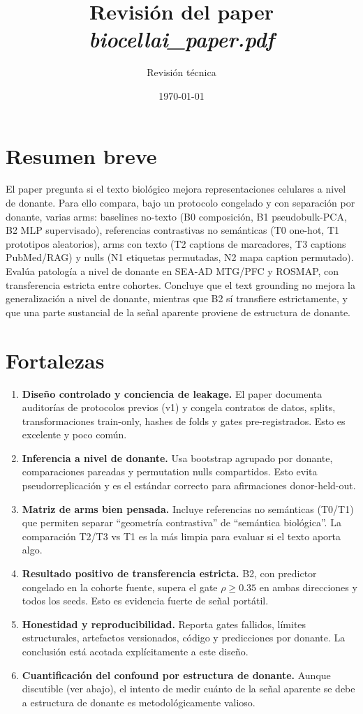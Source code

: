 \documentclass[11pt,a4paper]{article}
\title{Revisión del paper \textit{biocellai\_paper.pdf}}
\author{Revisión técnica}
\date{\today}
\begin{document}
\maketitle

\section*{Resumen breve}

El paper pregunta si el texto biológico mejora representaciones celulares a nivel de donante. Para ello compara, bajo un protocolo congelado y con separación por donante, varias arms: baselines no-texto (B0 composición, B1 pseudobulk-PCA, B2 MLP supervisado), referencias contrastivas no semánticas (T0 one-hot, T1 prototipos aleatorios), arms con texto (T2 captions de marcadores, T3 captions PubMed/RAG) y nulls (N1 etiquetas permutadas, N2 mapa caption permutado). Evalúa patología a nivel de donante en SEA-AD MTG/PFC y ROSMAP, con transferencia estricta entre cohortes. Concluye que el text grounding no mejora la generalización a nivel de donante, mientras que B2 sí transfiere estrictamente, y que una parte sustancial de la señal aparente proviene de estructura de donante.

\section*{Fortalezas}

\begin{enumerate}[label=\arabic*.]
    \item \textbf{Diseño controlado y conciencia de leakage.} El paper documenta auditorías de protocolos previos (v1) y congela contratos de datos, splits, transformaciones train-only, hashes de folds y gates pre-registrados. Esto es excelente y poco común.
    \item \textbf{Inferencia a nivel de donante.} Usa bootstrap agrupado por donante, comparaciones pareadas y permutation nulls compartidos. Esto evita pseudorreplicación y es el estándar correcto para afirmaciones donor-held-out.
    \item \textbf{Matriz de arms bien pensada.} Incluye referencias no semánticas (T0/T1) que permiten separar ``geometría contrastiva'' de ``semántica biológica''. La comparación T2/T3 vs T1 es la más limpia para evaluar si el texto aporta algo.
    \item \textbf{Resultado positivo de transferencia estricta.} B2, con predictor congelado en la cohorte fuente, supera el gate $\rho \geq 0.35$ en ambas direcciones y todos los seeds. Esto es evidencia fuerte de señal portátil.
    \item \textbf{Honestidad y reproducibilidad.} Reporta gates fallidos, límites estructurales, artefactos versionados, código y predicciones por donante. La conclusión está acotada explícitamente a este diseño.
    \item \textbf{Cuantificación del confound por estructura de donante.} Aunque discutible (ver abajo), el intento de medir cuánto de la señal aparente se debe a estructura de donante es metodológicamente valioso.
\end{enumerate}
\end{document}
